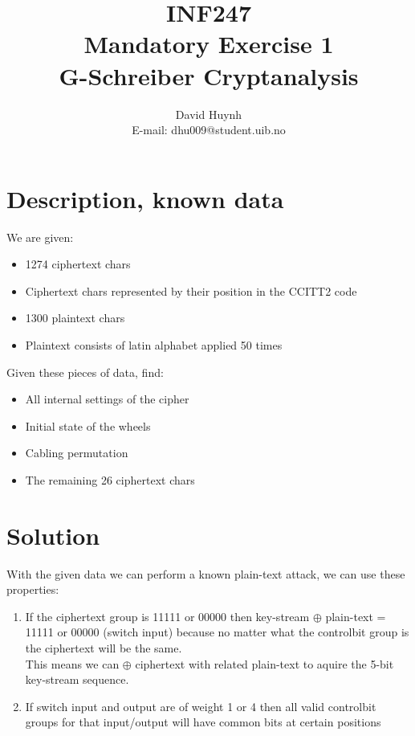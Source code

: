 \documentclass{article}
\begin{document}
\title{INF247\\ Mandatory Exercise 1\\ G-Schreiber Cryptanalysis}
\author{David Huynh\\ E-mail: dhu009@student.uib.no}
\date{}

\maketitle

\section{Description, known data}

We are given:
\begin{itemize}
	\item 1274 ciphertext chars
	\item Ciphertext chars represented by their position in the CCITT2 code
	\item 1300 plaintext chars
	\item Plaintext consists of latin alphabet applied 50 times
\end{itemize}

Given these pieces of data, find:
\begin{itemize}
	\item All internal settings of the cipher
	\item Initial state of the wheels
	\item Cabling permutation
	\item The remaining 26 ciphertext chars
\end{itemize}

\section{Solution}

With the given data we can perform a known plain-text attack, we can use these properties:
\begin{enumerate}
	\item If the ciphertext group is 11111 or 00000 then key-stream $\oplus$  plain-text = 11111 or 00000 (switch input) because no matter what the controlbit group is the ciphertext will be the same.\\ 
This means we can $\oplus$ ciphertext with related plain-text to aquire the 5-bit key-stream sequence.
	\item If switch input and output are of weight 1 or 4 then all valid controlbit groups for that input/output will have common bits at certain positions
\end{enumerate}
\end{document}
